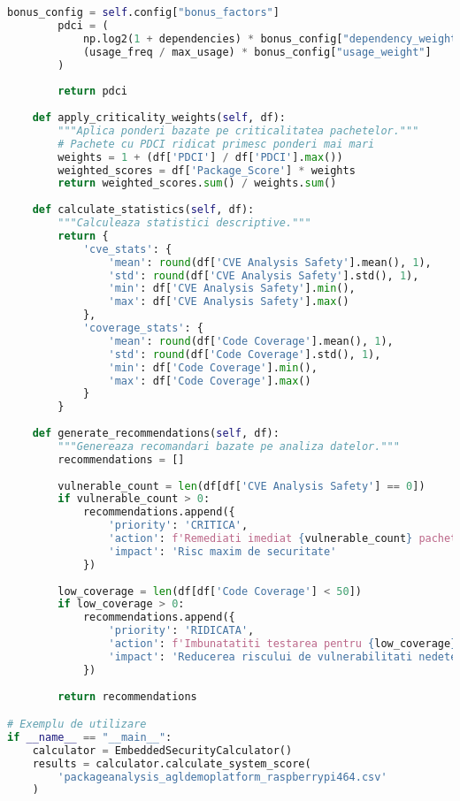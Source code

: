 \documentclass[12pt,a4paper]{article}
\begin{document}
\begin{lstlisting}[language=Python, caption=Script pentru calcularea scorului de securitate, label=lst:security_calculator]
        bonus_config = self.config["bonus_factors"]
        pdci = (
            np.log2(1 + dependencies) * bonus_config["dependency_weight"] +
            (usage_freq / max_usage) * bonus_config["usage_weight"]
        )
        
        return pdci
    
    def apply_criticality_weights(self, df):
        """Aplica ponderi bazate pe criticalitatea pachetelor."""
        # Pachete cu PDCI ridicat primesc ponderi mai mari
        weights = 1 + (df['PDCI'] / df['PDCI'].max())
        weighted_scores = df['Package_Score'] * weights
        return weighted_scores.sum() / weights.sum()
    
    def calculate_statistics(self, df):
        """Calculeaza statistici descriptive."""
        return {
            'cve_stats': {
                'mean': round(df['CVE Analysis Safety'].mean(), 1),
                'std': round(df['CVE Analysis Safety'].std(), 1),
                'min': df['CVE Analysis Safety'].min(),
                'max': df['CVE Analysis Safety'].max()
            },
            'coverage_stats': {
                'mean': round(df['Code Coverage'].mean(), 1),
                'std': round(df['Code Coverage'].std(), 1),
                'min': df['Code Coverage'].min(),
                'max': df['Code Coverage'].max()
            }
        }
    
    def generate_recommendations(self, df):
        """Genereaza recomandari bazate pe analiza datelor."""
        recommendations = []
        
        vulnerable_count = len(df[df['CVE Analysis Safety'] == 0])
        if vulnerable_count > 0:
            recommendations.append({
                'priority': 'CRITICA',
                'action': f'Remediati imediat {vulnerable_count} pachete cu CVE Score = 0',
                'impact': 'Risc maxim de securitate'
            })
        
        low_coverage = len(df[df['Code Coverage'] < 50])
        if low_coverage > 0:
            recommendations.append({
                'priority': 'RIDICATA',
                'action': f'Imbunatatiti testarea pentru {low_coverage} pachete cu coverage < 50%',
                'impact': 'Reducerea riscului de vulnerabilitati nedetectate'
            })
        
        return recommendations

# Exemplu de utilizare
if __name__ == "__main__":
    calculator = EmbeddedSecurityCalculator()
    results = calculator.calculate_system_score(
        'packageanalysis_agldemoplatform_raspberrypi464.csv'
    )
    

\end{lstlisting}
\end{document}
